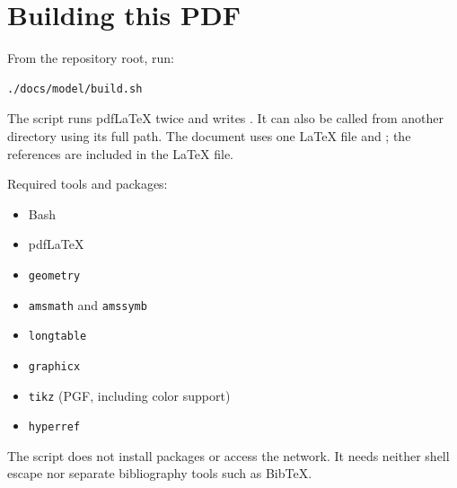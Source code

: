 \documentclass[11pt,a4paper]{article}
\numberwithin{equation}{section}
\begin{document}
\clearpage
\section{Building this PDF}
From the repository root, run:
\begin{verbatim}
./docs/model/build.sh
\end{verbatim}
The script runs pdfLaTeX twice and writes
. It can also be called from another
directory using its full path. The document uses one LaTeX file and
; the references are included in the LaTeX file.

Required tools and packages:
\begin{itemize}
  \item Bash
  \item pdfLaTeX
  \item \texttt{geometry}
  \item \texttt{amsmath} and \texttt{amssymb}
  \item \texttt{longtable}
  \item \texttt{graphicx}
  \item \texttt{tikz} (PGF, including color support)
  \item \texttt{hyperref}
\end{itemize}
The script does not install packages or access the network. It needs neither
shell escape nor separate bibliography tools such as BibTeX.
\end{document}
